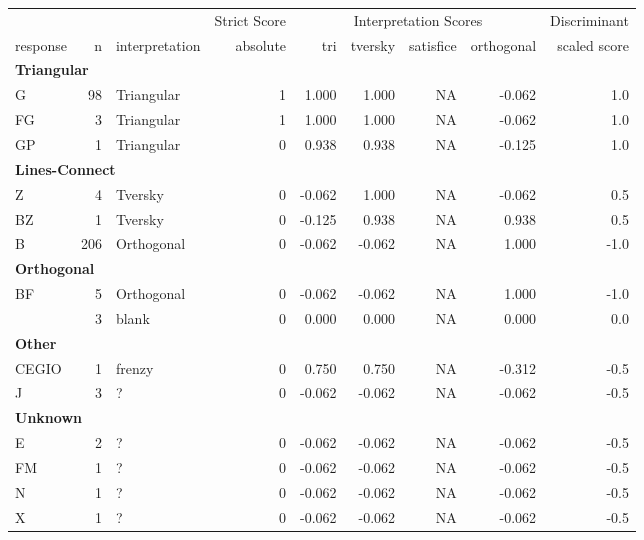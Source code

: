\documentclass[
  letterpaper,
  DIV=11,
  numbers=noendperiod]{scrreprt}
\begin{document}
\begin{tabular}[t]{l|r|l|r|r|r|r|r|r}
\hline
\multicolumn{3}{c|}{ } & \multicolumn{1}{c|}{Strict Score} & \multicolumn{4}{c|}{Interpretation Scores} & \multicolumn{1}{c}{Discriminant} \\
\cline{4-4} \cline{5-8} \cline{9-9}
response & n & interpretation & absolute & tri & tversky & satisfice & orthogonal & scaled score\\
\hline
\multicolumn{9}{l}{\textbf{Triangular}}\\
\hline
\hspace{1em}G & 98 & Triangular & 1 & 1.000 & 1.000 & NA & -0.062 & 1.0\\
\hline
\hspace{1em}FG & 3 & Triangular & 1 & 1.000 & 1.000 & NA & -0.062 & 1.0\\
\hline
\hspace{1em}GP & 1 & Triangular & 0 & 0.938 & 0.938 & NA & -0.125 & 1.0\\
\hline
\multicolumn{9}{l}{\textbf{Lines-Connect}}\\
\hline
\hspace{1em}Z & 4 & Tversky & 0 & -0.062 & 1.000 & NA & -0.062 & 0.5\\
\hline
\hspace{1em}BZ & 1 & Tversky & 0 & -0.125 & 0.938 & NA & 0.938 & 0.5\\
\hline
\hspace{1em}B & 206 & Orthogonal & 0 & -0.062 & -0.062 & NA & 1.000 & -1.0\\
\hline
\multicolumn{9}{l}{\textbf{Orthogonal}}\\
\hline
\hspace{1em}BF & 5 & Orthogonal & 0 & -0.062 & -0.062 & NA & 1.000 & -1.0\\
\hline
\hspace{1em} & 3 & blank & 0 & 0.000 & 0.000 & NA & 0.000 & 0.0\\
\hline
\multicolumn{9}{l}{\textbf{Other}}\\
\hline
\hspace{1em}CEGIO & 1 & frenzy & 0 & 0.750 & 0.750 & NA & -0.312 & -0.5\\
\hline
\hspace{1em}J & 3 & ? & 0 & -0.062 & -0.062 & NA & -0.062 & -0.5\\
\hline
\multicolumn{9}{l}{\textbf{Unknown}}\\
\hline
\hspace{1em}E & 2 & ? & 0 & -0.062 & -0.062 & NA & -0.062 & -0.5\\
\hline
\hspace{1em}FM & 1 & ? & 0 & -0.062 & -0.062 & NA & -0.062 & -0.5\\
\hline
\hspace{1em}N & 1 & ? & 0 & -0.062 & -0.062 & NA & -0.062 & -0.5\\
\hline
\hspace{1em}X & 1 & ? & 0 & -0.062 & -0.062 & NA & -0.062 & -0.5\\
\hline
\end{tabular}
\end{document}
